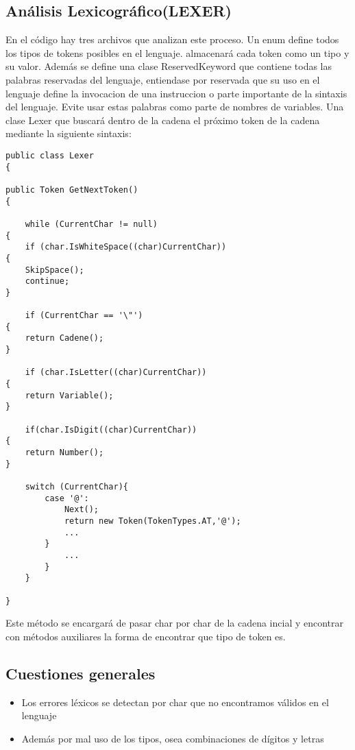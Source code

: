 \documentclass[a4paper,12pt]{article}
\begin{document}
\subsection{An\'alisis Lexicogr\'afico(LEXER)}\label{sub:center}
    En el c\'odigo hay tres archivos que analizan este proceso. Un enum define todos los tipos de tokens posibles en el lenguaje.
    almacenar\'a cada token como un tipo y su valor. Adem\'as se define una clase ReservedKeyword que contiene todas las palabras reservadas del lenguaje, entiendase por reservada que su uso en el lenguaje define la invocacion de una instruccion o parte importante de la sintaxis del lenguaje. Evite usar estas palabras como parte de nombres de variables.
    Una clase Lexer que buscar\'a dentro de la cadena el pr\'oximo token de la cadena mediante la siguiente sintaxis:
\begin{lstlisting}[style=csharp]
public class Lexer
{
    
public Token GetNextToken()
{
        
    while (CurrentChar != null)
{
    if (char.IsWhiteSpace((char)CurrentChar))
{
    SkipSpace(); 
    continue;
}

    if (CurrentChar == '\"')
{
    return Cadene();
}

    if (char.IsLetter((char)CurrentChar))
{
    return Variable();
}           

    if(char.IsDigit((char)CurrentChar))
{
    return Number();
}

    switch (CurrentChar){
        case '@':
            Next();
            return new Token(TokenTypes.AT,'@');
            ...
        }
            ... 
        }
    }
            
}
    \end{lstlisting}

    Este m\'etodo se encargar\'a de pasar char por char de la cadena incial y encontrar con m\'etodos auxiliares la forma de encontrar que tipo de token es.

    \subsection*{Cuestiones generales}
    \begin{itemize}
        \item Los errores l\'exicos se detectan por char que no encontramos v\'alidos en el lenguaje
        \item Adem\'as por mal uso de los tipos, osea combinaciones de d\'igitos y letras
    \end{itemize}
\end{document}
